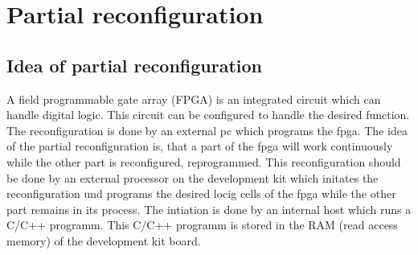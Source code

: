 \section{Partial reconfiguration}
\subsection{Idea of partial reconfiguration}
A field programmable gate array (FPGA) is an integrated circuit which can handle digital logic. This circuit can be configured to handle the desired function. 
The reconfiguration is done by an external pc which programs the fpga. The idea of the partial reconfiguration is, that a part of the fpga will work continuously while the other part is reconfigured, reprogrammed.
This reconfiguration should be done by an external processor on the development kit which initates the reconfiguration und programs the desired locig cells of the fpga while the other part remains in its process.
The intiation is done by an internal host which runs a C/C++ programm. This C/C++ programm is stored in the RAM (read access memory) of the development kit board.